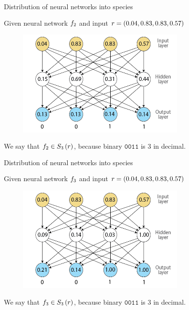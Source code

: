 \begin{frame}{Distribution of neural networks into species}
\begin{center}
Given neural network $f_2$ and input $r = (0.04, 0.83, 0.83, 0.57)$
  \begin{figure}[p]
  \includegraphics[width=0.75\textwidth]{images/nntdexample2.png}
  \end{figure}
We say that $f_2 \in S_{3}\left(r\right)$, because binary $\texttt{0011}$ is $3$ in decimal.
\end{center}
\end{frame}

\begin{frame}{Distribution of neural networks into species}
\begin{center}
Given neural network $f_3$ and input $r = (0.04, 0.83, 0.83, 0.57)$
  \begin{figure}[p]
  \includegraphics[width=0.75\textwidth]{images/nntdexample3.png}
  \end{figure}
We say that $f_3 \in S_{3}\left(r\right)$, because binary $\texttt{0011}$ is $3$ in decimal.
\end{center}
\end{frame}

